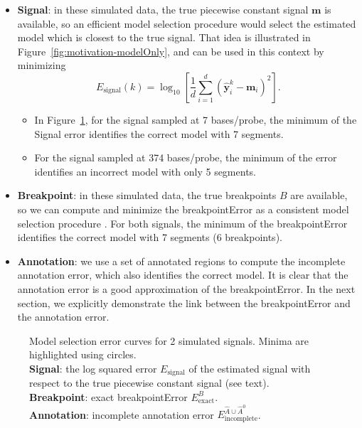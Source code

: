 \documentclass{jsfds} %
\begin{document}
\begin{itemize}
\item \textbf{Signal}: in these simulated data, the true piecewise
  constant signal $\mathbf m$ is available, so an efficient model
  selection procedure \citep{sylvain-survey} would select the
  estimated model which is closest to the true signal. That idea is
  illustrated in Figure~\ref{fig:motivation-modelOnly}, and can be
  used in this context by minimizing
  \begin{equation}
    \label{eq:signal_cost}
    E_{\text{signal}}(k) = \log_{10}\left[
\frac 1 d \sum_{i=1}^d(\mathbf{\hat y}_i^k - \mathbf m_i)^2
\right].
  \end{equation}
  \begin{itemize}
  \item In Figure~\ref{fig:variable-density-sigerr-small}, for the
    signal sampled at 7 bases/probe, the minimum of the Signal error
    identifies the correct model with 7 segments.
\item For the signal sampled at 374 bases/probe, the minimum of the
  error identifies an incorrect model with only 5
  segments.
  \end{itemize}
\item \textbf{Breakpoint}: in these simulated data, the true
  breakpoints $B$ are available, so we can compute and minimize the
  breakpointError as a consistent model selection procedure
  \citep{sylvain-survey}. For both signals, the minimum of the
  breakpointError identifies the correct model with 7 segments (6
  breakpoints).
\item \textbf{Annotation}: we use a set of annotated regions to
  compute the incomplete annotation error, which also identifies the
  correct model. It is clear that the annotation error is a good
  approximation of the breakpointError. In the next section, we
  explicitly demonstrate the link between the breakpointError and the
  annotation error.
\end{itemize}
\begin{figure}[H]
  \centering
  
  \vskip -0.5cm
  \caption{Model selection error curves for 2 simulated
    signals. Minima are highlighted using circles.
    \protect\\
    \textbf{Signal}: the log squared error $E_{\text{signal}}$ of the
    estimated signal with respect to the
    true piecewise constant signal (see text).
    \protect\\
    \textbf{Breakpoint}: exact breakpointError $E^B_{\text{exact}}$.
    \protect\\
    \textbf{Annotation}: incomplete annotation error
    $E^{\hat A\cup \hat A^0}_{\text{incomplete}}$.
}
  \label{fig:variable-density-sigerr-small}
\end{figure}
\end{document}
